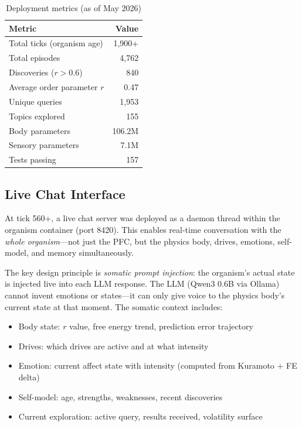 \documentclass[11pt,a4paper,twocolumn]{article}
\begin{document}
\begin{table}[h]
\centering
\caption{Deployment metrics (as of May 2026)}
\begin{tabular}{lr}
\toprule
Metric & Value \\
\midrule
Total ticks (organism age) & 1,900+ \\
Total episodes & 4,762 \\
Discoveries ($r > 0.6$) & 840 \\
Average order parameter $r$ & 0.47 \\
Unique queries & 1,953 \\
Topics explored & 155 \\
Body parameters & 106.2M \\
Sensory parameters & 7.1M \\
Tests passing & 157 \\
\bottomrule
\end{tabular}
\label{tab:deployment_metrics}
\end{table}

\subsection{Live Chat Interface}

At tick 560+, a live chat server was deployed as a daemon thread within the organism container (port 8420).
This enables real-time conversation with the \emph{whole organism}---not just the PFC, but the physics body, drives, emotions, self-model, and memory simultaneously.

The key design principle is \emph{somatic prompt injection}: the organism's actual state is injected live into each LLM response.
The LLM (Qwen3 0.6B via Ollama) cannot invent emotions or states---it can only give voice to the physics body's current state at that moment.
The somatic context includes:
\begin{itemize}
\item Body state: $r$ value, free energy trend, prediction error trajectory
\item Drives: which drives are active and at what intensity
\item Emotion: current affect state with intensity (computed from Kuramoto + FE delta)
\item Self-model: age, strengths, weaknesses, recent discoveries
\item Current exploration: active query, results received, volatility surface
\end{itemize}
\end{document}
